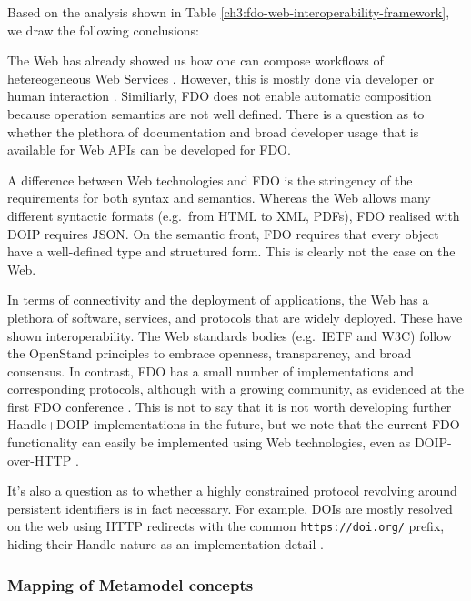 Based on the analysis shown in Table \vref{ch3:fdo-web-interoperability-framework}, we draw the following conclusions:

The Web has already showed us how one can compose workflows of hetereogeneous Web Services \cite{wolstencroftTavernaWorkflowSuite2013d}. However, this is mostly done via developer or human interaction \cite{lamprechtPerspectivesAutomatedComposition2021b}. Similiarly, FDO does not enable automatic composition because operation semantics are not well defined. There is a question as to whether the plethora of documentation and broad developer usage that is available for Web APIs can be developed for FDO.

A difference between Web technologies and FDO is the stringency of the requirements for both syntax and semantics. Whereas the Web allows many different syntactic formats (e.g.~from HTML to XML, PDFs), FDO realised with DOIP requires JSON. On the semantic front, FDO requires that every object have a well-defined type and structured form. This is clearly not the case on the Web.

In terms of connectivity and the deployment of applications, the Web has a plethora of software, services, and protocols that are widely deployed. These have shown interoperability. The Web standards bodies (e.g.~IETF and W3C) follow the OpenStand principles \cite{ModernStandardsParadigm} to embrace openness, transparency, and broad consensus. In contrast, FDO has a small number of implementations and corresponding protocols, although with a growing community, as evidenced at the first FDO conference \cite{looFirstInternationalConference2022}. This is not to say that it is not worth developing further Handle+DOIP implementations in the future, but we note that the current FDO functionality can easily be implemented using Web technologies, even as DOIP-over-HTTP \cite{DOIPAPIHTTPa}.

It's also a question as to whether a highly constrained protocol revolving around persistent identifiers is in fact necessary. For example, DOIs are mostly resolved on the web \cite{DOIResolutionDocumentation} using HTTP redirects with the common \texttt{https://doi.org/} prefix, hiding their Handle nature as an implementation detail \cite{DOIHandbookResolution}.

\hypertarget{mapping-of-metamodel-concepts}{%
\subsubsection{Mapping of Metamodel concepts}\label{mapping-of-metamodel-concepts}}

